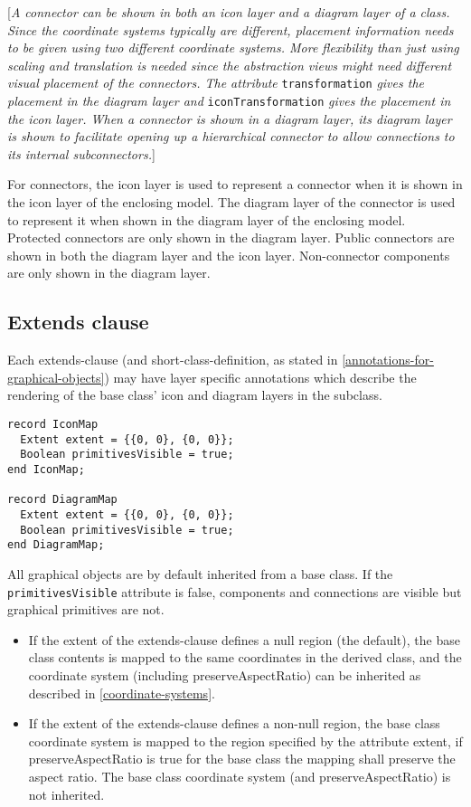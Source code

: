 {[}\emph{A connector can be shown in both an icon layer and a diagram
layer of a class. Since the coordinate systems typically are different,
placement information needs to be given using two different coordinate
systems. More flexibility than just using scaling and translation is
needed since the abstraction views might need different visual placement
of the connectors. The attribute} \lstinline!transformation! \emph{gives the placement in
the diagram layer and} \lstinline!iconTransformation! \emph{gives the placement in the icon
layer. When a connector is shown in a diagram layer, its diagram layer
is shown to facilitate opening up a hierarchical connector to allow
connections to its internal subconnectors.}{]}

For connectors, the icon layer is used to represent a connector when it
is shown in the icon layer of the enclosing model. The diagram layer of
the connector is used to represent it when shown in the diagram layer of
the enclosing model. Protected connectors are only shown in the diagram
layer. Public connectors are shown in both the diagram layer and the
icon layer. Non-connector components are only shown in the diagram
layer.

\subsection{Extends clause}

Each extends-clause (and short-class-definition, as stated in \autoref{annotations-for-graphical-objects})
may have layer specific annotations which describe
the rendering of the base class' icon and diagram layers in the
subclass.

\begin{lstlisting}[language=modelica]
record IconMap
  Extent extent = {{0, 0}, {0, 0}};
  Boolean primitivesVisible = true;
end IconMap;

record DiagramMap
  Extent extent = {{0, 0}, {0, 0}};
  Boolean primitivesVisible = true;
end DiagramMap;
\end{lstlisting}
All graphical objects are by default inherited from a base class. If the
\lstinline!primitivesVisible! attribute is false, components and connections are
visible but graphical primitives are not.

\begin{itemize}
\item
  If the extent of the extends-clause defines a null region (the
  default), the base class contents is mapped to the same coordinates in
  the derived class, and the coordinate system (including
  preserveAspectRatio) can be inherited as described in
  \autoref{coordinate-systems}.
\item
  If the extent of the extends-clause defines a non-null region, the
  base class coordinate system is mapped to the region specified by the
  attribute extent, if preserveAspectRatio is true for the base class
  the mapping shall preserve the aspect ratio. The base class coordinate
  system (and preserveAspectRatio) is not inherited.
\end{itemize}

